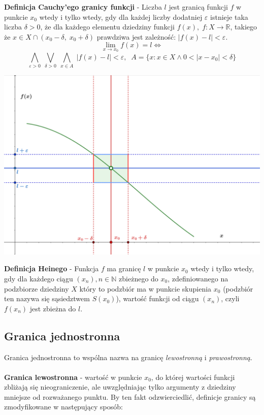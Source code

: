 \documentclass[14pt,a4paper]{extarticle}
\begin{document}
\noindent\textbf{Definicja Cauchy'ego granicy funkcji} - Liczba $l$ jest granicą funkcji $f$ w punkcie $x_{0}$ wtedy i tylko wtedy, gdy dla
każdej liczby dodatniej $\varepsilon$ istnieje taka liczba $\delta > 0$, że dla każdego elementu dziedziny funkcji $f(x), \; f: X \rightarrow \mathbb{R}$, takiego że
$x \in X \cap (x_{0} - \delta,\; x_{0} + \delta)$ prawdziwa jest zależność: $\vert f(x) - l\vert < \varepsilon$.\\
$$\lim_{x\to x_{0}} f(x) = l \Leftrightarrow $$
$$\underset{\varepsilon > 0}{\bigwedge} \;\underset{\delta > 0}{\bigvee} \; \underset{x \in A}{\bigwedge} \; \vert f(x) - l\vert < \varepsilon, \;\; A = \{x:x\in X \land 0 < \vert x - x_{0}\vert < \delta\}$$
\begin{center}
\includegraphics[scale=0.51]{limit funkcji.png}
\end{center}

\newpage
\noindent\textbf{Definicja Heinego} - Funkcja $f$ ma granicę $l$ w punkcie $x_{0}$ wtedy i tylko wtedy,
gdy dla każdego ciągu $(x_{n}), n \in \mathbb{N}$ zbieżnego do $x_{0}$, zdefiniowanego na podzbiorze dziedziny $X$ który
to podzbiór ma w punkcie skupienia $x_{0}$ (podzbiór ten nazywa się sąsiedztwem $S(x_{0})$), wartość funkcji od ciągu $(x_{n})$, czyli $f(x_{n})$ jest zbieżna do $l$.

\subsection{Granica jednostronna}
\noindent Granica jednostronna to wspólna nazwa na granicę \textit{lewostronną} i \textit{prawostronną}.\\\\
\noindent\textbf{Granica lewostronna} - wartość w punkcie $x_{0}$, do której wartości funkcji zbliżają się nieograniczenie,
ale uwzględniając tylko argumenty z dziedziny mniejsze od rozważanego punktu. By ten fakt odzwierciedlić, definicje
granicy są zmodyfikowane w następujący sposób:\\
\end{document}
